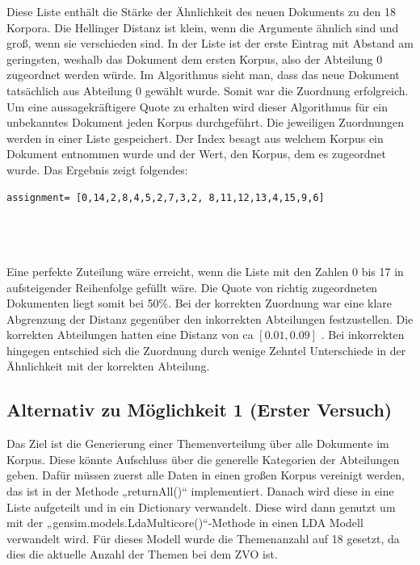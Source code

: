 \documentclass[german,version-2020-11]{uzl-thesis}
\begin{document}
Diese Liste enthält die Stärke der Ähnlichkeit des neuen Dokuments zu den 18 Korpora. Die Hellinger Distanz ist klein, wenn die Argumente ähnlich sind und groß, wenn sie verschieden sind. In der Liste ist der erste Eintrag mit Abstand am geringsten, weshalb das Dokument dem ersten Korpus, also der Abteilung 0 zugeordnet werden würde. Im Algorithmus sieht man, dass das neue Dokument tatsächlich aus Abteilung 0 gewählt wurde. Somit war die Zuordnung erfolgreich. \\

Um eine aussagekräftigere Quote zu erhalten wird dieser Algorithmus für ein unbekanntes Dokument jeden Korpus durchgeführt. Die jeweiligen Zuordnungen werden in einer Liste gespeichert. Der Index besagt aus welchem Korpus ein Dokument entnommen wurde und der Wert, den Korpus, dem es zugeordnet wurde. Das Ergebnis zeigt folgendes: \\

\begin{lstlisting}
assignment= [0,14,2,8,4,5,2,7,3,2, 8,11,12,13,4,15,9,6]
\end{lstlisting}\\
\\
\\

Eine perfekte Zuteilung wäre erreicht, wenn die Liste mit den Zahlen 0 bis 17 in aufsteigender Reihenfolge gefüllt wäre. Die Quote von richtig zugeordneten Dokumenten liegt somit bei 50\%. Bei der korrekten Zuordnung war eine klare Abgrenzung der Distanz gegenüber den inkorrekten Abteilungen festzustellen. Die korrekten Abteilungen hatten eine Distanz von ca $[0.01,0.09]$ . Bei inkorrekten hingegen entschied sich die Zuordnung durch wenige Zehntel Unterschiede in der Ähnlichkeit mit der korrekten Abteilung. 

\subsection{Alternativ zu Möglichkeit 1 (Erster Versuch)} Das Ziel ist die Generierung einer Themenverteilung über alle Dokumente im Korpus. Diese könnte Aufschluss über die generelle Kategorien der Abteilungen geben. Dafür müssen zuerst alle Daten in einen großen Korpus vereinigt werden, das ist in der Methode „returnAll()“ implementiert. Danach wird diese in eine Liste aufgeteilt und in ein Dictionary verwandelt. Diese wird dann genutzt um mit der „gensim.models.LdaMulticore()“-Methode in einen LDA Modell verwandelt wird. Für dieses Modell wurde die Themenanzahl auf 18 gesetzt, da dies die aktuelle Anzahl der Themen bei dem ZVO ist. 
\end{document}

